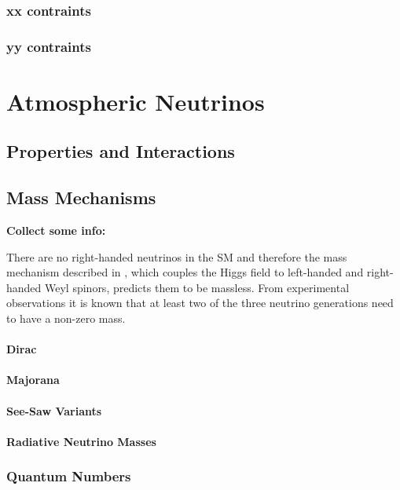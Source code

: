 \subsubsection{xx contraints}

\subsubsection{yy contraints}


\section{Atmospheric Neutrinos}



\subsection{Properties and Interactions}



\subsection{Mass Mechanisms}

\textbf{Collect some info:}


There are no right-handed neutrinos in the SM and therefore the mass mechanism described in , which couples the Higgs field to left-handed and right-handed Weyl spinors, predicts them to be massless. From experimental observations it is known that at least two of the three neutrino generations need to have a non-zero mass.

\paragraph{Dirac}
\paragraph{Majorana}

\paragraph{See-Saw Variants}

\paragraph{Radiative Neutrino Masses}

\subsubsection{Quantum Numbers}
